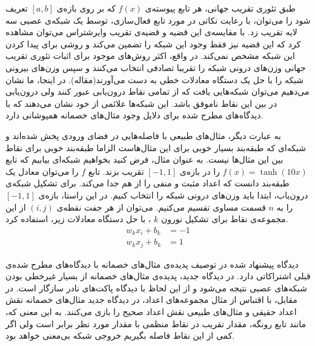 \documentclass[12pt,onecolumn,a4paper]{article}
\begin{document}
طبق تئوری تقریب جهانی، هر تابع پیوسته‌ی $f(x)$ که بر روی بازه‌ی $[a,b]$ تعریف شود را می‌توان، با رعایت نکاتی در مورد تابع فعال‌سازی، توسط یک شبکه‌ی عصبی سه لایه تقریب زد. با مقایسه‌ی این قضیه و قضیه‌ی تقریب وایرشتراس می‌توان مشاهده کرد که این قضیه نیز فقط وجود این شبکه را تضمین می‌کند و روشی برای پیدا کردن این شبکه مشخص نمی‌کند. در واقع، اکثر روش‌های موجود برای اثبات تئوری تقریب جهانی وزن‌های درونی شبکه را تقریبا تصادفی انتخاب می‌کنند و سپس وزن‌های بیرونی شبکه را با حل یک دستگاه معادلات خطی به دست می‌آورند(مقاله). در اینجا، ما نشان می‌دهیم می‌توان شبکه‌هایی یافت که از تمامی نقاط درون‌یابی عبور کنند ولی درون‌یابی در بین این نقاط ناموفق باشد. این شبکه‌ها علائمی از خود نشان می‌دهند که با دیدگاه‌های مطرح شده برای دلایل وجود مثال‌های خصمانه همپوشانی دارد.

به عبارت دیگر، مثال‌های طبیعی با فاصله‌هایی در فضای ورودی پخش شده‌اند و شبکه‌ای که طبقه‌بند بسیار خوبی برای این مثال‌هاست الزاما طبقه‌بند خوبی برای نقاط بین این مثال‌ها نیست. به عنوان مثال، فرض کنید بخواهیم شبکه‌ای بیابیم که تابع 
$f(x)=\tanh(10x)$ 
را در بازه‌ی 
$[-1,1]$
تقریب بزند. تابع 
$f$ 
را می‌توان معادل یک طبقه‌بند دانست که اعداد مثبت و منفی را از هم جدا می‌کند. برای تشکیل شبکه‌ی درون‌یاب، ابتدا باید وزن‌های درونی شبکه را انتخاب کنیم. در این راستا، بازه‌ی 
$[-1,1]$ 
را به 
$n$ 
قسمت مساوی تقسیم می‌کنیم. می‌توان از هر جفت نقطه‌ی 
$(i,j)$
از این مجموعه‌ی نقاط برای تشکیل نورون
$k$
، با حل دستگاه معادلات زیر، استفاده کرد.
\begin{align*}
   w_kx_i+b_k&=-1\\
   w_kx_j+b_k&=1
\end{align*}

دیدگاه پیشنهاد شده در توصیف پدیده‌ی مثال‌های خصمانه با دیدگاه‌های مطرح شده‌ی قبلی اشتراکاتی دارد. در دیدگاه جدید، پدیده‌ی مثال‌های خصمانه از بسیار غیرخطی بودن شبکه‌های عصبی نتیجه می‌شود و از این لحاظ با دیدگاه پاکت‌های نادر سازگار است. در مقابل، با اقتباس از مثال مجموعه‌های اعداد، در دیدگاه جدید مثال‌های خصمانه نقش اعداد حقیقی و مثال‌های طبیعی نقش اعداد صحیح را بازی می‌کنند. به این معنی که، مانند تابع رونگه، مقدار تقریب در نقاط منظمی با مقدار مورد نظر برابر است ولی اگر کمی از این نقاط فاصله بگیریم خروجی شبکه بی‌معنی خواهد بود.
\end{document}
